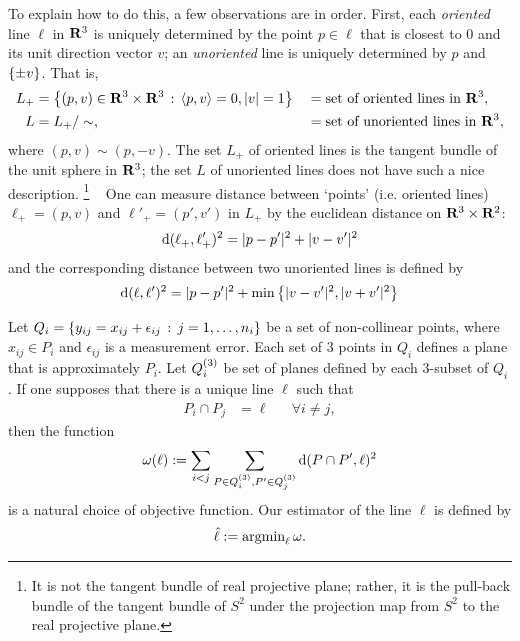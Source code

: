 \documentclass[a4paper,reqno]{amsart}
\begin{document}
To explain how to do this, a few observations are in order. First,
each {\em oriented} line $\ell$ in ${\mathbf R}^3$ is uniquely determined by
the point $p \in \ell$ that is closest to $0$ and its unit direction
vector $v$; an {\em unoriented} line is uniquely determined by $p$ and
$\left\{\pm v\right\}$. That is,
\begin{align*}
  L_+ &= \left\{ (p,v) \in {\mathbf R}^3 \times {\mathbf R}^3 \,:\, \langle p,v \rangle=0,|v|=1 \right\}
    && =\textrm{set of oriented lines in }{\mathbf R}^3,\\
    L &= L_+/\sim, && =\textrm{set of unoriented lines in }{\mathbf R}^3,
\end{align*}
where $(p,v) \sim (p,-v)$. The set $L_+$ of oriented lines is the
tangent bundle of the unit sphere in ${\mathbf R}^3$; the set $L$ of unoriented
lines does not have such a nice description.%
\footnote{It is not the tangent bundle of real projective plane;
  rather, it is the pull-back bundle of the tangent bundle of $S^2$
  under the projection map from $S^2$ to the real projective plane.}
\ %
One can measure distance between `points' (i.e. oriented lines) $\ell_+=(p,v)$
and $\ell'_+=(p',v')$ in $L_+$ by the euclidean distance on ${\mathbf R}^3
\times {\mathbf R}^2$:
\begin{equation}
  \label{eq:distance-between-lines}
  {\mathrm d}(\ell_+,\ell'_+)^2 = |p-p'|^2 + |v-v'|^2
\end{equation}
and the corresponding distance between two unoriented lines is defined
by
\begin{equation}
  \label{eq:distance-between-unoriented-lines}
  {\mathrm d}(\ell,\ell')^2 = |p-p'|^2 + \min\left\{ |v-v'|^2,|v+v'|^2\right\}
\end{equation}

Let $Q_i=\left\{y_{ij}=x_{ij}+\epsilon_{ij} \,:\, j=1,\ldots,n_i\right\}$ be a
set of non-collinear points, where $x_{ij} \in P_i$ and
$\epsilon_{ij}$ is a measurement error. Each set of $3$ points in
$Q_i$ defines a plane that is approximately $P_i$. Let
$Q_i^{(3)}$ be set of planes defined by each $3$-subset of
  $Q_i$. If one supposes that there is a unique line $\ell$ such that
  \begin{align}
    \label{eq:plane-intersection}
    P_i \cap P_j &= \ell && \forall i\neq j,
  \end{align}
then the function
\begin{align}
  \label{eq:objective-function}
  \omega(\ell) := \sum_{i < j}
  \sum_{P\in Q_i^{(3)},P'\in Q_j^{(3)}} {\mathrm d}(P \cap P',\ell)^2
\end{align}
is a natural choice of objective function. Our estimator of the line
$\ell$ is defined by
\begin{align}
  \label{eq:line-estimator}
  \hat{\ell} := {\displaystyle\mathrm{argmin}_{\ell}\,\omega}.
\end{align}
\end{document}
